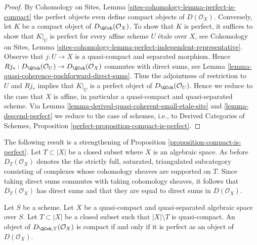 \begin{proof}
By Cohomology on Sites, Lemma \ref{sites-cohomology-lemma-perfect-is-compact}
the perfect objects even define compact objects of $D(\mathcal{O}_X)$.
Conversely, let $K$ be a compact object of $D_\QCoh(\mathcal{O}_X)$.
To show that $K$ is perfect, it suffices to show that
$K|_U$ is perfect for every affine scheme $U$ \'etale over $X$, see
Cohomology on Sites, Lemma
\ref{sites-cohomology-lemma-perfect-independent-representative}.
Observe that $j : U \to X$ is a quasi-compact and separated morphism.
Hence
$Rj_* : D_\QCoh(\mathcal{O}_U) \to D_\QCoh(\mathcal{O}_X)$
commutes with direct sums, see
Lemma \ref{lemma-quasi-coherence-pushforward-direct-sums}.
Thus the adjointness of restriction to $U$ and $Rj_*$ implies that
$K|_U$ is a perfect object of $D_\QCoh(\mathcal{O}_U)$.
Hence we reduce to the case that $X$ is affine, in particular a
quasi-compact and quasi-separated scheme. Via
Lemma \ref{lemma-derived-quasi-coherent-small-etale-site} and
\ref{lemma-descend-perfect}
we reduce to the case of schemes, i.e., to
Derived Categories of Schemes, Proposition
\ref{perfect-proposition-compact-is-perfect}.
\end{proof}

\noindent
The following result is a strengthening of
Proposition \ref{proposition-compact-is-perfect}.
Let $T \subset |X|$ be a closed subset where $X$ is an algebraic space.
As before $D_T(\mathcal{O}_X)$ denotes the the strictly full, saturated,
triangulated subcategory consisting of complexes whose
cohomology sheaves are supported on $T$. Since taking direct
sums commutes with taking cohomology sheaves, it follows
that $D_T(\mathcal{O}_X)$ has direct sums and that they are equal
to direct sums in $D(\mathcal{O}_X)$.

\begin{lemma}
\label{lemma-compact-is-perfect-with-support}
Let $S$ be a scheme.
Let $X$ be a quasi-compact and quasi-separated algebraic space over $S$.
Let $T \subset |X|$ be a closed subset such that $|X| \setminus T$
is quasi-compact. An object of $D_{\QCoh, T}(\mathcal{O}_X)$ is compact
if and only if it is perfect as an object of $D(\mathcal{O}_X)$.
\end{lemma}

